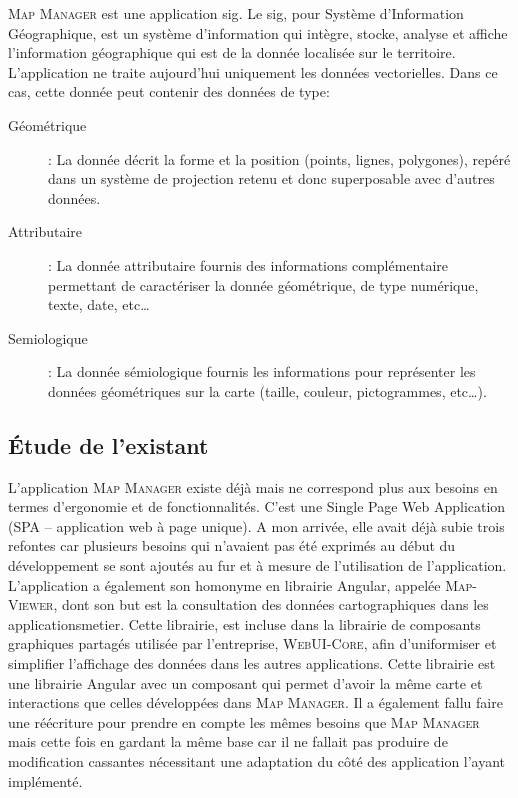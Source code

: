 \documentclass{rapportUHA40}
\begin{document}

\textsc{Map Manager} est une application \gls{sig}. Le \gls{sig}, pour Système
d'Information Géographique, est un système d’information qui intègre, stocke,
analyse et affiche l'information géographique qui est de la donnée localisée
sur le territoire. L'application ne traite aujourd'hui uniquement les données
vectorielles. Dans ce cas, cette donnée peut contenir des données de type:
\begin{description}
  \item[Géométrique]: La donnée décrit la forme et la position (points, lignes,
  polygones), repéré dans un système de projection retenu et donc superposable
  avec d'autres données.
  \item[Attributaire]: La donnée attributaire fournis des informations complémentaire
  permettant de caractériser la donnée géométrique, de type numérique, texte,
  date, etc\ldots
  \item[Semiologique]: La donnée sémiologique fournis les informations pour représenter
  les données géométriques sur la carte (taille, couleur, pictogrammes,
  etc\ldots).
\end{description}

\subsection{Étude de l'existant}
L'application \textsc{Map Manager} existe déjà mais ne correspond plus aux
besoins en termes d'ergonomie et de fonctionnalités. C'est une Single Page Web
Application (SPA – application web à page unique). A mon arrivée, elle avait
déjà subie trois refontes car plusieurs besoins qui n'avaient pas été exprimés
au début du développement se sont ajoutés au fur et à mesure de l'utilisation
de l'application. \\

L'application a également son homonyme en librairie Angular, appelée
\textsc{Map-Viewer}, dont son but est la consultation des données
cartographiques dans les \gls{applicationsmetier}. Cette librairie, est incluse
dans la librairie de composants graphiques partagés utilisée par l'entreprise,
\textsc{WebUI-Core}, afin d'uniformiser et simplifier l'affichage des données
dans les autres applications. Cette librairie est une librairie Angular avec un
composant qui permet d'avoir la même carte et interactions que celles
développées dans \textsc{Map Manager}. Il a également fallu faire une
réécriture pour prendre en compte les mêmes besoins que \textsc{Map Manager}
mais cette fois en gardant la même base car il ne fallait pas produire de
modification cassantes nécessitant une adaptation du côté des application
l'ayant implémenté.
\end{document}
